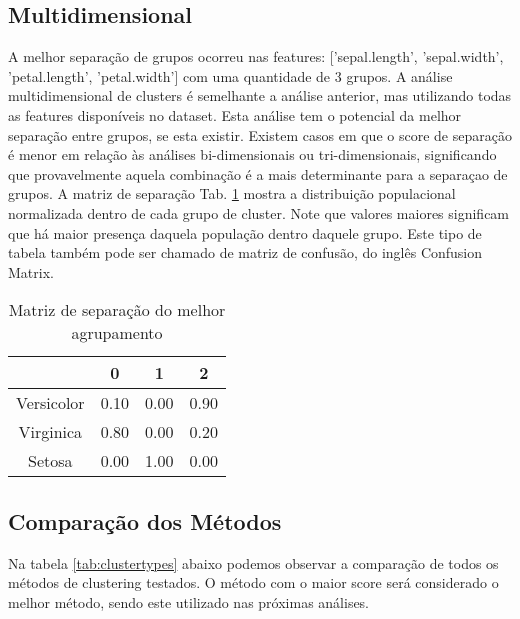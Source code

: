 \documentclass{article}%
\begin{document}
%
\subsection{Multidimensional}%
\label{subsec:Multidimensional}%
A melhor separação de grupos ocorreu nas features: {[}'sepal.length', 'sepal.width', 'petal.length', 'petal.width'{]} com uma quantidade de 3 grupos. A análise multidimensional de clusters é semelhante a análise anterior, mas utilizando todas as features disponíveis no dataset. Esta análise tem o potencial da melhor separação entre grupos, se esta existir. Existem casos em que o score de separação é menor em relação às análises bi{-}dimensionais ou tri{-}dimensionais, significando que provavelmente aquela combinação é a mais determinante para a separaçao de grupos.%
\newline%
A matriz de separação Tab. \ref{tab:matsep} mostra a distribuição populacional normalizada dentro de cada grupo de cluster. Note que valores maiores significam que há maior presença daquela população dentro daquele grupo. Este tipo de tabela também pode ser chamado de matriz de confusão, do inglês Confusion Matrix.%
\newline%


\begin{table}[htbp]%
\caption{Matriz de separação do melhor agrupamento}%
\centering%
\begin{tabular}{cccc}
\toprule
{} &    0 &    1 &    2 \\
\midrule
Versicolor & 0.10 & 0.00 & 0.90 \\
Virginica  & 0.80 & 0.00 & 0.20 \\
Setosa     & 0.00 & 1.00 & 0.00 \\
\bottomrule
\end{tabular}
%
\label{tab:matsep}%
\end{table}

%
\subsection{Comparação dos Métodos}%
\label{subsec:ComparaodosMtodos}%
Na tabela \ref{tab:clustertypes} abaixo podemos observar a comparação de todos os métodos de clustering testados. O método com o maior score será considerado o melhor método, sendo este utilizado nas próximas análises.%
\newline%
\end{document}

